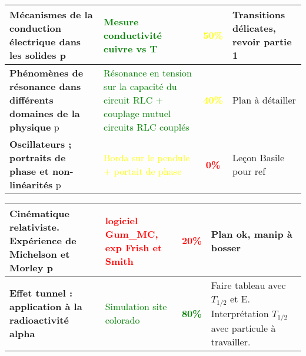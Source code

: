 \begin{changemargin}{-1.5cm}{-0cm}
\begin{center}
\begin{tabularx}{\paperwidth-2cm}{| X | X | c | X |}
  \hline
  \textbf{Mécanismes de la conduction électrique dans les solides} p\pageref{LP_Conduction} & \textcolor{green}{Mesure conductivité cuivre vs T} & \textcolor{yellow}{\textbf{50\%}} & Transitions délicates, revoir partie 1 \\
  \hline
  \textbf{Phénomènes de résonance dans différents domaines de la physique} p\pageref{LP_resonance} & \textcolor{green}{Résonance en tension sur la capacité du circuit RLC + couplage mutuel circuits RLC couplés} & \textcolor{yellow}{\textbf{40\%}} & Plan à détailler  \\
  \hline
  \textbf{Oscillateurs ; portraits de phase et non-linéarités} p\pageref{LP_PortaitPhase}~& \textcolor{yellow}{Borda sur le pendule + portait de phase} & \textcolor{red}{\textbf{0\%}} & Leçon Basile pour ref  \\
  \hline
\end{tabularx}
\end{center}

\begin{center}
\begin{tabularx}{\paperwidth-2cm}{| X | X | c | X |}
\hline
  \textbf{Cinématique relativiste. Expérience de Michelson et Morley} p\pageref{LP_CinematiqueRelativiste} & \textcolor{red}{logiciel Gum\_MC, exp Frish et Smith} & \textcolor{red}{\textbf{20\%}} & Plan ok, manip à bosser  \\
  \hline
  \textbf{Effet tunnel : application à la radioactivité alpha} & \textcolor{green}{Simulation site colorado} & \textcolor{green}{\textbf{80\%}} & Faire tableau avec $T_{1/2}$ et E. Interprétation $T_{1/2}$ avec particule à travailler. \\
  \hline

\end{tabularx}
\end{center}

\end{changemargin}